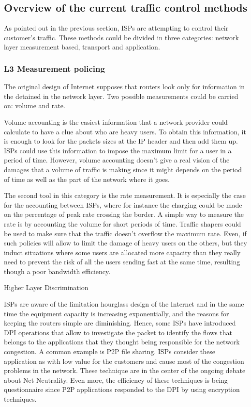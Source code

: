 \subsection{Overview of  the current traffic control methods}
As pointed out in the previous section, ISPs are attempting to control their customer's traffic. These methods could be divided in three categories: network layer measurement based, transport and application.

\subsubsection{L3 Measurement policing}

The original design of Internet supposes that routers look only for information in the detained in the network layer. Two possible measurements could be carried on: volume and rate.

Volume accounting is the easiest information that a network provider could calculate to have a clue about who are heavy users. To obtain this information, it is enough to look for the packets sizes at the IP header and then add them up. ISPs could use this information to impose the maximum limit for a user in a period of time. However, volume accounting doesn't give a real vision of the damages that a volume of traffic is making since it might depends on the period of time as well as the part of the network where it goes.

The second tool in this category is the rate measurement. It is especially the case for the accounting between ISPs, where for instance the charging could be made on the percentage of peak rate crossing the border. A simple way to measure the rate is by accounting the volume for short periods of  time. Traffic shapers could be used to make sure that the traffic doesn't overflow the maximum rate. Even, if such policies will allow to limit the damage of heavy users on the others, but they induct situations where some users are allocated more capacity than they really need to prevent the risk of all the users sending fast at the same time, resulting though a poor bandwidth efficiency.

Higher Layer Discrimination

ISPs are aware of the limitation hourglass design of the Internet and in the same time the equipment capacity is increasing exponentially, and the reasons for keeping the routers simple are diminishing. Hence, some ISPs have introduced DPI operations that allow to investigate the packet to identify the flows that belongs to the applications that they thought being responsible for the network congestion. A common example is P2P file sharing. ISPs consider these application as with low value for the customers and cause most of the congestion problems in the network. These technique are in the center of the ongoing debate about Net Neutrality. Even more, the efficiency of these techniques is being questionnaire since P2P applications 
responded to the DPI by using encryption techniques.

